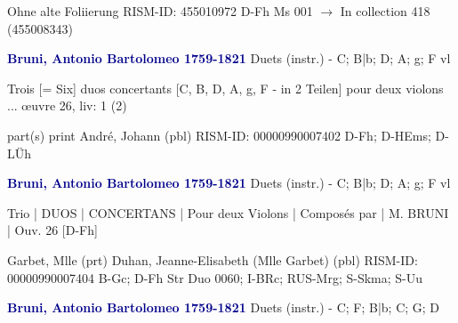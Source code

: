 \documentclass[twocolumn]{book}
\begin{document}
\newline Ohne alte Foliierung
\newline RISM-ID: 455010972
\newline D-Fh  Ms 001
\newline $\rightarrow$ In collection 418 (455008343)
      
\newline \par \vspace{7pt} \textcolor{darkblue}{\textbf{Bruni, Antonio Bartolomeo  1759-1821}}
\newline Duets (instr.) - C; B|b; D; A; g; F
 vl
\newline \begin{itshape}Trois [= Six] duos concertants [C, B, D, A, g, F - in 2 Teilen] pour deux violons ... œuvre 26, liv: 1 (2)\end{itshape} 
\newline \textcolor{darkblue}{}  part(s)
\newline print
\newline André, Johann  (pbl)
\newline RISM-ID: 00000990007402
\newline D-Fh; D-HEms; D-LÜh
\newline \par \vspace{7pt} \textcolor{darkblue}{\textbf{Bruni, Antonio Bartolomeo  1759-1821}}
\newline Duets (instr.) - C; B|b; D; A; g; F
 vl
\newline \begin{itshape}Trio | DUOS | CONCERTANS | Pour deux Violons | Composés par | M. BRUNI | Ouv. 26 [D-Fh]\end{itshape} 
\newline Garbet, Mlle  (prt)
\newline Duhan, Jeanne-Elisabeth (Mlle Garbet)  (pbl)
\newline RISM-ID: 00000990007404
\newline B-Gc; D-Fh  Str Duo 0060; I-BRc; RUS-Mrg; S-Skma; S-Uu
\newline \par \vspace{7pt} \textcolor{darkblue}{\textbf{Bruni, Antonio Bartolomeo  1759-1821}}
\newline Duets (instr.) - C; F; B|b; C; G; D
\end{document}
